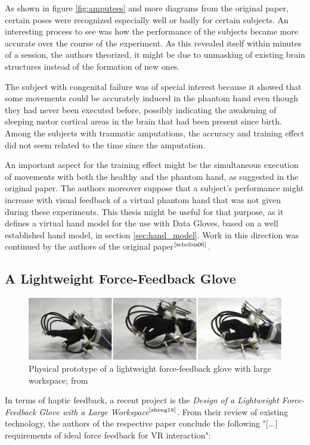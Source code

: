 \documentclass[hyperref, bachelorofscience]{cgvpub}
\newcommand{\newcite}[1]{$ ^{\text{\cite{#1}}} $}
\begin{document}
As shown in figure \ref{fig:amputees} and more diagrams from the original paper, certain poses were recognized especially well or badly for certain subjects. An interesting process to see was how the performance of the subjects became more accurate over the course of the experiment. As this revealed itself within minutes of a session, the authors theorized, it might be due to unmasking of existing brain structures instead of the formation of new ones. 

The subject with congenital failure was of special interest because it showed that some movements could be accurately induced in the phantom hand even though they had never been executed before, possibly indicating the awakening of sleeping motor cortical areas in the brain that had been present since birth. Among the subjects with traumatic amputations, the accuracy and training effect did not seem related to the time since the amputation.

An important aspect for the training effect might be the simultaneous execution of movements with both the healthy and the phantom hand, as suggested in the original paper. The authors moreover suppose that a subject's performance might increase with visual feedback of a virtual phantom hand that was not given during these experiments. This thesis might be useful for that purpose, as it defines a virtual hand model for the use with Data Gloves, based on a well established hand model, in section \ref{sec:hand_model}. Work in this direction was continued by the authors of the original paper\newcite{sebelius06}.

\subsection{A Lightweight Force-Feedback Glove}
\begin{figure}
	\centering
	\includegraphics{../pics/force_feedback_proto}
	\caption{Physical prototype of a lightweight force-feedback glove with large workspace; from 
		\cite{zheng18}}
	\label{fig:force_feedback_proto}
\end{figure}

In terms of haptic feedback, a recent project is the \emph{Design of a Lightweight Force-Feedback Glove with a Large Workspace}\newcite{zheng18}. From their review of existing technology, the authors of the respective paper conclude the following "[$\dots$] requirements of ideal force feedback for VR interaction":
\end{document}
